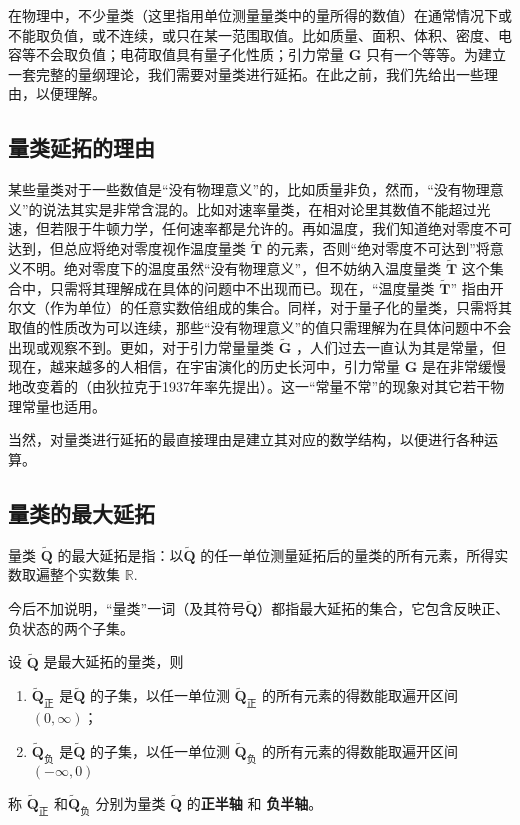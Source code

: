 

在物理中，不少量类（这里指用单位测量量类中的量所得的数值）在通常情况下或不能取负值，或不连续，或只在某一范围取值。比如质量、面积、体积、密度、电容等不会取负值；电荷取值具有量子化性质；引力常量 $\boldsymbol{G}$ 只有一个等等。为建立一套完整的量纲理论，我们需要对量类进行延拓。在此之前，我们先给出一些理由，以便理解。
\subsection{量类延拓的理由}
某些量类对于一些数值是“没有物理意义”的，比如质量非负，然而，“没有物理意义”的说法其实是非常含混的。比如对速率量类，在相对论里其数值不能超过光速，但若限于牛顿力学，任何速率都是允许的。再如温度，我们知道绝对零度不可达到，但总应将绝对零度视作温度量类 $\tilde{\boldsymbol{T}}$ 的元素，否则“绝对零度不可达到”将意义不明。绝对零度下的温度虽然“没有物理意义”，但不妨纳入温度量类 $\tilde{\boldsymbol{T}}$ 这个集合中，只需将其理解成在具体的问题中不出现而已。现在，“温度量类 $\tilde{\boldsymbol{T}}$” 指由开尔文（作为单位）的任意实数倍组成的集合。同样，对于量子化的量类，只需将其取值的性质改为可以连续，那些“没有物理意义”的值只需理解为在具体问题中不会出现或观察不到。更如，对于引力常量量类 $\tilde{\boldsymbol{G}}$ ，人们过去一直认为其是常量，但现在，越来越多的人相信，在宇宙演化的历史长河中，引力常量 $\boldsymbol{G}$ 是在非常缓慢地改变着的（由狄拉克于1937年率先提出）。这一“常量不常”的现象对其它若干物理常量也适用。

当然，对量类进行延拓的最直接理由是建立其对应的数学结构，以便进行各种运算。
\subsection{量类的最大延拓}
\begin{definition}{}
量类 $\tilde{\boldsymbol{Q}}$ 的最大延拓是指：以$\tilde{\boldsymbol{Q}}$ 的任一单位测量延拓后的量类的所有元素，所得实数取遍整个实数集 $\mathbb{R}$.
\end{definition}
今后不加说明，“量类”一词（及其符号$\tilde{\boldsymbol{Q}}$）都指最大延拓的集合，它包含反映正、负状态的两个子集。
\begin{definition}{}
设 $\tilde{\boldsymbol{Q}}$ 是最大延拓的量类，则
\begin{enumerate}
\item $\tilde{\boldsymbol{Q}}_{\text{正}}$ 是$\tilde{\boldsymbol{Q}}$ 的子集，以任一单位测 $\tilde{\boldsymbol{Q}}_{\text{正}}$ 的所有元素的得数能取遍开区间 $(0,\infty)$；
\item $\tilde{\boldsymbol{Q}}_{\text{负}}$ 是$\tilde{\boldsymbol{Q}}$ 的子集，以任一单位测 $\tilde{\boldsymbol{Q}}_{\text{负}}$ 的所有元素的得数能取遍开区间 $(-\infty,0)$
\end{enumerate}
称 $\tilde{\boldsymbol{Q}}_{\text{正}}$ 和$\tilde{\boldsymbol{Q}}_{\text{负}}$ 分别为量类 $\tilde{\boldsymbol{Q}}$ 的\textbf{正半轴} 和 \textbf{负半轴}。
\end{definition}
